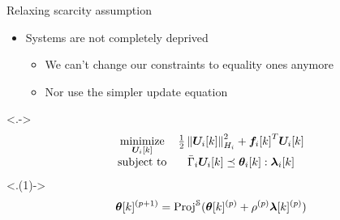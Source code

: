 \documentclass[aspectratio=169]{beamer}
\begin{document}

\begin{frame}{Relaxing scarcity assumption}
  \begin{itemize}[<+(1)->]
    \item Systems are not completely deprived
          \begin{itemize}[<+(1)->]
            \item We can't change our constraints to equality ones anymore
            \item Nor use the simpler update equation
          \end{itemize}
  \end{itemize}

  \centering
  \onslide<.->{
    \begin{equation*}
      \begin{matrix}
        \minimize\limits_{\vec{U}_{i}[k]}&\frac{1}{2}\norm{\vec{U}_{i}[k]}^{2}_{H_{i}} + {\vec{f}_{i}[k]}^{T}\vec{U}_{i}[k]\\
        \mathrm{subject~ to} & \bar{\Gamma}_{i}\vec{U}_{i}[k] \preceq \thetaik:\lambdaik\\
      \end{matrix}
    \end{equation*}
  }
  \onslide<.(1)->{
    \begin{equation*}
      \boldsymbol{\theta}[k]^{(p+1)}=\operatorname{Proj}^{\mathcal{S}}(\boldsymbol{\theta}[k]^{(p)}+\rho^{(p)}\boldsymbol{\lambda}[k]^{(p)})
    \end{equation*}
  }

\end{frame}
\end{document}
